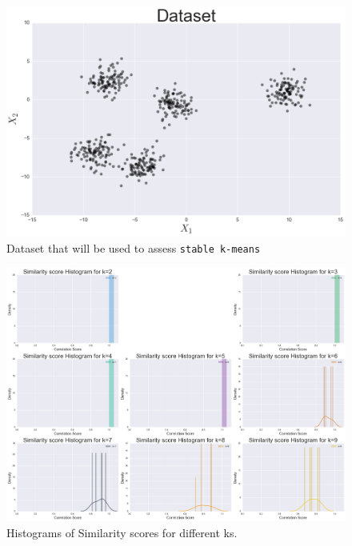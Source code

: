 \documentclass[10pt,twocolumn,letterpaper]{article}
\begin{document}
\begin{figure}[htbp] 
\begin{center}
\includegraphics[scale=0.25]{figure/dataset.png}
\end{center}
\caption{\label{fig:Dataset-that-will}Dataset that will be used to assess
\texttt{stable k-means}}
\end{figure}


\begin{figure}[htbp] 
\begin{center}
\includegraphics[scale=0.35]{figure/histogram.png}
\end{center}
\caption{\label{fig:Histograms-of-Similarity}Histograms of Similarity scores
for different ks.}
\end{figure}
\end{document}
